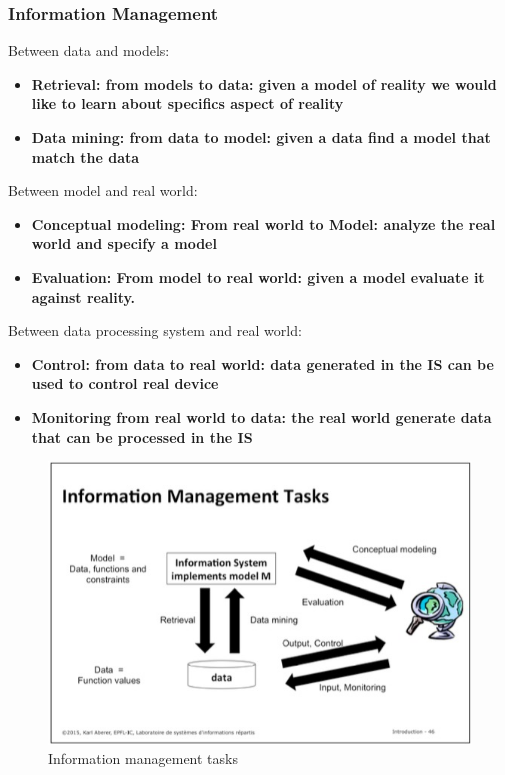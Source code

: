 \subsubsection{Information Management}
Between data and models:
\begin{itemize}
	\item \bf{Retrieval:} from models to data: given a model of reality we would like to learn about specifics aspect of reality
	\item \bf{Data mining:} from data to model: given a data find a model that match the data
\end{itemize}
Between model and real world:
\begin{itemize}
	\item \bf{Conceptual modeling:} From real world to Model: analyze the real world and specify a model
	\item \bf{Evaluation:} From model to real world: given a model evaluate it against reality.
\end{itemize}
Between data processing system and real world:
\begin{itemize}
	\item \bf{Control:} from data to real world: data generated in the IS can be used to control real device
	\item \bf{Monitoring} from real world to data: the real world generate data that can be processed in the IS
\end{itemize}

\begin{figure}[!ht]
\begin{center}
\includegraphics[width=1\linewidth]{figures/informationManagementTasks.jpg}
\end{center}
\caption{Information management tasks}
\end{figure}

